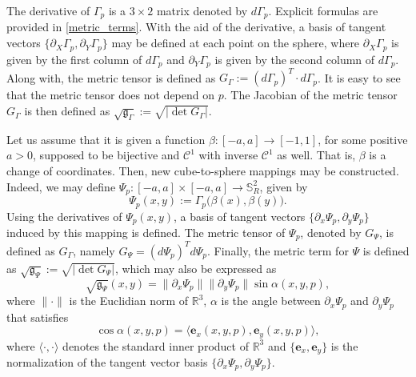 \documentclass[preprint,12pt]{elsarticle}
\begin{document}
\begin{linenumbers}
The derivative of ${\Gamma}_p$ is a $3\times2$ matrix denoted by $d{\Gamma}_p$. Explicit formulas are provided in  \ref{metric_terms}.
With the aid of the derivative,  a basis of tangent vectors $\{{\partial_X {\Gamma}_p, \partial_Y {\Gamma}_p}\}$ may be defined
at each point on the sphere, where $\partial_X {\Gamma}_p$ is given by the first column of $d{\Gamma}_p$ 
and $\partial_Y {\Gamma}_p$ is given by the second column of $d{\Gamma}_p$.
Along with, the metric tensor is defined as
$G_{{\Gamma}} := (d\Gamma_p)^T \cdot d\Gamma_p$.
It is easy to see that the metric tensor does not depend on $p$.
The Jacobian of the metric tensor $G_{{\Gamma}}$ is then defined as $\sqrt{\mathfrak{g}_{{\Gamma}}} :=
\sqrt{|\det{G_{{\Gamma}}}|}.$

Let us assume that it is given a function $\beta:[-a,a] \to [-1,1]$, for some positive $a>0$,
supposed to be bijective and $\mathcal{C}^1$ with inverse $\mathcal{C}^1$ as well.
That is, $\beta$ is a change of coordinates.
Then, new cube-to-sphere mappings may be constructed.
Indeed, we may define $ {\Psi}_p: [-a,a]\times [-a,a] \to \mathbb{S}^2_R$,
given by 
\begin{equation}
	\label{psi-def}
	{\Psi}_p(x,y) := {\Gamma}_p\big(\beta(x),\beta(y)\big).
\end{equation}
Using the derivatives of ${\Psi}_p(x,y)$, a basis of tangent vectors $\{{\partial_x {\Psi}_p}, {\partial_y {\Psi}_p}\}$ induced by this mapping is defined.
The metric tensor of ${\Psi}_p$, denoted by $G_{\Psi}$, is defined as $G_{\Gamma}$, namely $G_{\Psi} = (d\Psi_p)^T d\Psi_p$.
Finally, the metric term for $\Psi$ is defined as $\sqrt{\mathfrak{g}_{\Psi}}:= \sqrt{|\det{G_{\Psi}}|}$,
which may also be expressed as
\begin{equation}
	\label{mt-sina}
	\sqrt{\mathfrak{g}_{\Psi}}(x,y) =	
	\|\partial_x  {\Psi}_p \| \|\partial_y  {\Psi}_p \| \sin \alpha(x,y,p),
\end{equation}
where $\|\cdot\|$ is the Euclidian norm of $\mathbb{R}^3$, $\alpha$ is the angle between $\partial_x {\Psi}_p$ and $\partial_y {\Psi}_p$ that
satisfies
\begin{equation}
	\label{mt-cosa}
	\cos{\alpha(x,y,p)} = {\langle
		\boldsymbol{e}_x(x,y,p),
		\boldsymbol{e}_y(x,y,p) \rangle },
\end{equation}
where $\langle \cdot, \cdot \rangle$ denotes 
the standard inner product of $\mathbb{R}^3$ and 
$\{\boldsymbol{e}_x, \boldsymbol{e}_y\}$ is the normalization of the tangent vector basis
$\{{\partial_x {\Psi}_p}, {\partial_y {\Psi}_p}\}$.


\end{linenumbers}
\end{document}

